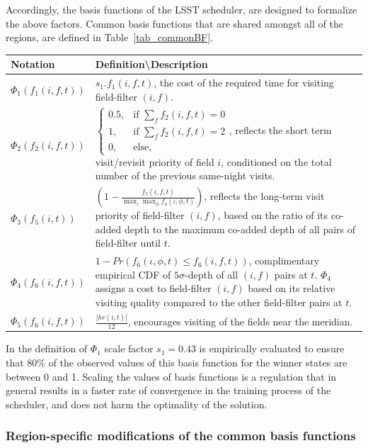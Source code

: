 \documentclass[12pt]{aastex62}
\theoremstyle{definition}
\begin{document}
Accordingly, the basis functions of the LSST scheduler, are designed to formalize the above factors. Common basis functions that are shared amongst all of the regions, are defined in Table~\ref{tab_commonBF}.


\begin{table}[h]
\begin{tabularx}{\textwidth}{| l | X |}
\hline
Notation & Definition\textbackslash Description\\ \hline \hline
$\Phi_1(f_1(i,f,t))$ & $s_1.f_1(i,f,t)$, the cost of the required time for visiting field-filter $(i,f)$.\\ \hline
$\Phi_2(f_2(i,f,t))$ &$\begin{cases}0.5,& \text{if } \sum\limits_{f}{f_2(i,f,t)} = 0\\ 1,& \text{if } \sum\limits_{f}{f_2(i,f,t)} = 2\\ 0,  & \text{else,}\end{cases}$, \newline reflects the short term visit/revisit priority of field $i$, conditioned on the total number of the previous same-night visits.\\ \hline
$\Phi_3(f_5(i,t))$ &  $(1 - \frac{f_5(i,f,t)}{\max_\iota \max_\phi f_4(\iota,\phi,t)})$, reflects the long-term visit priority of field-filter $(i,f)$, based on the ratio of its co-added depth to the maximum co-added depth of all pairs of field-filter until $t$.\\ \hline
$\Phi_4(f_6(i,f,t))$ & $1 - Pr(f_6(\iota,\phi,t) \leq f_6(i,f,t))$, complimentary empirical CDF of $5\sigma$-depth of all $(i,f)$ pairs at $t$. $\Phi_4$ assigns a cost to field-filter $(i,f)$ based on its relative visiting quality compared to the other field-filter pairs at $t$.\\ \hline
$\Phi_5(f_6(i,f,t))$ &  $\frac{|hr(i,t)|}{12}$, encourages visiting of the fields near the meridian.\\ \hline
\end{tabularx}
\end{table}\label{tab_commonBF}

In the definition of $\Phi_1$ scale factor $s_1= 0.43$ is empirically evaluated to ensure that 80\% of the observed values of this basis function for the winner states are between 0 and 1. Scaling the values of basis functions is a regulation that in general results in a faster rate of convergence in the training process of the scheduler, and does not harm the optimality of the solution.

\subsubsection{Region-specific modifications of the common basis functions}
\end{document}
